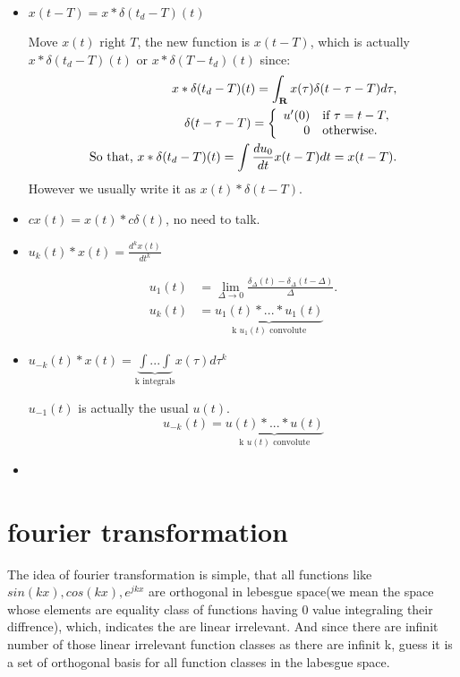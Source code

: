 \documentclass[11pt]{article}
\begin{document}
\begin{itemize}
\item \(x(t - T) = x * \delta(t_d - T)(t)\) 

Move \(x(t)\) right \(T\), the new function is \(x(t - T)\), which is actually \(x * \delta(t_d - T)(t) \text{ or } x * \delta(T - t_d)(t)\) since:
\begin{align}
  x*\delta(t_d - T)(t) = \int_{\mathbf{R}}x(\tau)\delta(t-\tau-T)d\tau, \notag \\
  \delta(t-\tau-T) = \left\{
    \begin{array}{rl}
      u'(0) & \text{if } \tau = t - T, \\
      0 & \text{otherwise}.
    \end{array}
  \right. \notag \\
  \text{So that, } x*\delta(t_d - T)(t) = \int \frac{du_0}{dt} x(t - T) dt = x(t - T). \notag
\end{align}
However we usually write it as \(x(t) * \delta(t - T)\).
\item \(cx(t) = x(t) * c\delta(t)\), no need to talk.
\item \(u_k(t)*x(t) = \frac{d^kx(t)}{dt^k}\)

\begin{align}
  u_1(t) & = \lim_{\varDelta \rightarrow 0}
           \frac{
           \delta_{\varDelta}(t) - \delta_{\varDelta}(t - \varDelta)}
           {
           \varDelta}. \\ 
  u_k(t) & = \underbrace{u_1(t) * ... * u_1(t)}_{\text{k } u_1(t) \text{ convolute}}
\end{align}
\item \(u_{-k}(t)*x(t) = \underbrace{\int ... \int}_{\text{k integrals}} x(\tau)d\tau^k\)

\(u_{-1}(t)\) is actually the usual \(u(t)\).
\begin{equation}
  u_{-k}(t) = \underbrace{u(t) * ... * u(t)}_{\text{k } u(t) \text{ convolute}}
\end{equation}
\item 
\end{itemize}
\section{fourier transformation}
\label{sec:orge354c28}

The idea of fourier transformation is simple, that all functions like \(sin(kx), cos(kx), e^{jkx}\) are orthogonal in lebesgue space(we mean the space whose elements are equality class of functions having 0 value integraling their diffrence), which, indicates the are linear irrelevant. And since there are infinit number of those linear irrelevant function classes as there are infinit k, guess it is a set of orthogonal basis for all function classes in the labesgue space.
\end{document}
